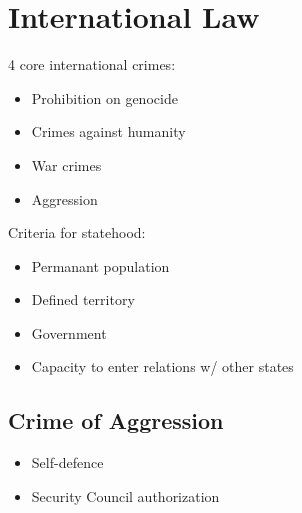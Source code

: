 \documentclass[
  letterpaper,
  landscape,
  columns=3,
  draft,
]{cheatsheet}
\begin{document}
  \section{International Law}
  4 core international crimes:
  \begin{itemize}
    \item Prohibition on genocide
    \item Crimes against humanity
    \item War crimes
    \item Aggression
  \end{itemize}
  Criteria for statehood:
  \begin{itemize}
    \item Permanant population
    \item Defined territory
    \item Government
    \item Capacity to enter relations w/ other states
  \end{itemize}
  \subsection{Crime of Aggression}
  \begin{definition}[de minumus]

  \end{definition}
  \begin{itemize}
    \item Self-defence
    \item Security Council authorization
  \end{itemize}
\end{document}
